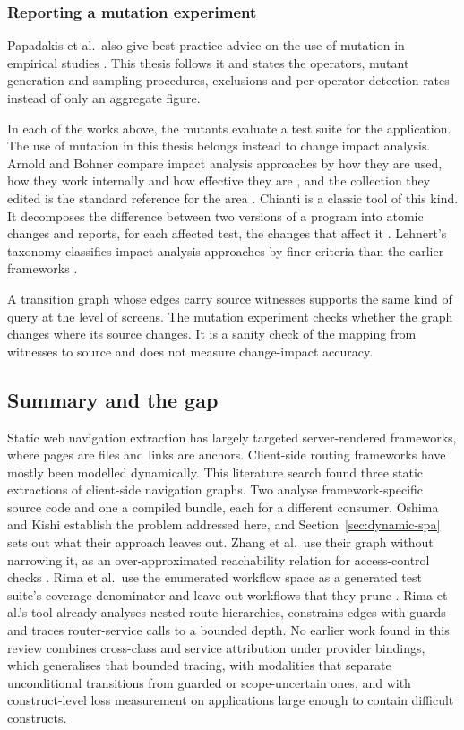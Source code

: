 \subsubsection{Reporting a mutation experiment}

Papadakis et al.\ also give best-practice advice on the use of mutation in empirical studies
\cite{papadakis2019mutation}. This thesis follows it and states the operators,
mutant generation and sampling procedures, exclusions and per-operator detection rates instead of
only an aggregate figure.

In each of the works above, the mutants evaluate a test suite for the application. The use of
mutation in this thesis belongs instead to change impact analysis. Arnold and Bohner compare impact analysis approaches by how they are used, how they work
internally and how effective they are \cite{arnold1993impact}, and the collection they edited is
the standard reference for the area \cite{bohner1996software}. Chianti is a classic tool
of this kind. It decomposes the difference between two versions of a program into atomic changes
and reports, for each affected test, the changes that affect it \cite{ren2004chianti}. Lehnert's
taxonomy classifies impact analysis approaches by finer criteria than the earlier frameworks
\cite{lehnert2011taxonomy}.

A transition graph whose edges carry source witnesses supports the same kind of query at the
level of screens. The mutation experiment checks whether the graph changes where its source
changes. It is a sanity check of the mapping from witnesses to source and does not measure
change-impact accuracy.

\subsection{Summary and the gap}
\label{sec:gap}

Static web navigation extraction has largely targeted server-rendered frameworks, where pages
are files and links are anchors. Client-side routing frameworks have mostly been modelled
dynamically. This literature search found three static extractions of client-side navigation
graphs. Two analyse framework-specific source code and one a compiled bundle, each for a
different consumer. Oshima and Kishi establish the problem addressed here, and
Section~\ref{sec:dynamic-spa} sets out what their approach leaves out. Zhang et al.\ use their graph without
narrowing it, as an over-approximated reachability relation for access-control checks
\cite{zhang2025veriflow}. Rima et al.\ use the enumerated workflow space as a generated test
suite's coverage denominator and leave out workflows that they prune \cite{rima2026e2e}.
Rima et al.'s tool already analyses nested route hierarchies, constrains edges with guards and
traces router-service calls to a bounded depth. No earlier work found in this review combines
cross-class and service attribution under provider bindings, which generalises that bounded
tracing, with modalities that separate unconditional transitions from guarded or scope-uncertain
ones, and with construct-level loss measurement on applications large enough to contain
difficult constructs.

